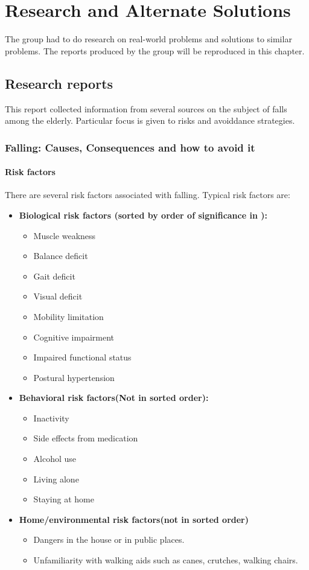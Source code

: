 \chapter{Research and Alternate Solutions}
The group had to do research on real-world problems and solutions to similar problems. The reports produced by the group will be reproduced in this chapter.
\section{Research reports}
This report collected information from several sources on the subject of falls among the elderly. Particular focus is given to risks and avoiddance strategies.
\subsection{Falling: Causes, Consequences and how to avoid it}

\subsubsection*{Risk factors}

There are several risk factors associated with falling. Typical risk factors are:
\begin{itemize}
\item 
\textbf{Biological risk factors (sorted by order of significance in  \cite{fallsRubenstein}):}
\begin{itemize}
\item Muscle weakness
\item Balance deficit
\item Gait deficit
\item Visual deficit
\item Mobility limitation
\item Cognitive impairment
\item Impaired functional status
\item Postural hypertension
\end{itemize}
\item 
\textbf{Behavioral risk factors(Not in sorted order):}
\begin{itemize}
\item Inactivity
\item Side effects from medication
\item Alcohol use
\item Living alone
\item Staying at home
\end{itemize}
\item 
\textbf{Home/environmental risk factors(not in sorted order)}
\begin{itemize}
\item Dangers in the house or in public places.
\item Unfamiliarity with walking aids such as canes, crutches, walking chairs.
\end{itemize}
\end{itemize}

